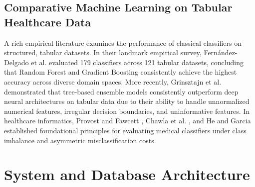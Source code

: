 \documentclass[conference]{IEEEtran}
\begin{document}
\subsection{Comparative Machine Learning on Tabular Healthcare Data}
A rich empirical literature examines the performance of classical classifiers on structured, tabular datasets. In their landmark empirical survey, Fern{\'a}ndez-Delgado et al. \cite{fernandez2014we} evaluated 179 classifiers across 121 tabular datasets, concluding that Random Forest and Gradient Boosting consistently achieve the highest accuracy across diverse domain spaces. More recently, Grinsztajn et al. \cite{grinsztajn2022tree} demonstrated that tree-based ensemble models consistently outperform deep neural architectures on tabular data due to their ability to handle unnormalized numerical features, irregular decision boundaries, and uninformative features. In healthcare informatics, Provost and Fawcett \cite{provost2001robust}, Chawla et al. \cite{chawla2002smote}, and He and Garcia \cite{he2009learning} established foundational principles for evaluating medical classifiers under class imbalance and asymmetric misclassification costs.

\section{System and Database Architecture}
\end{document}
